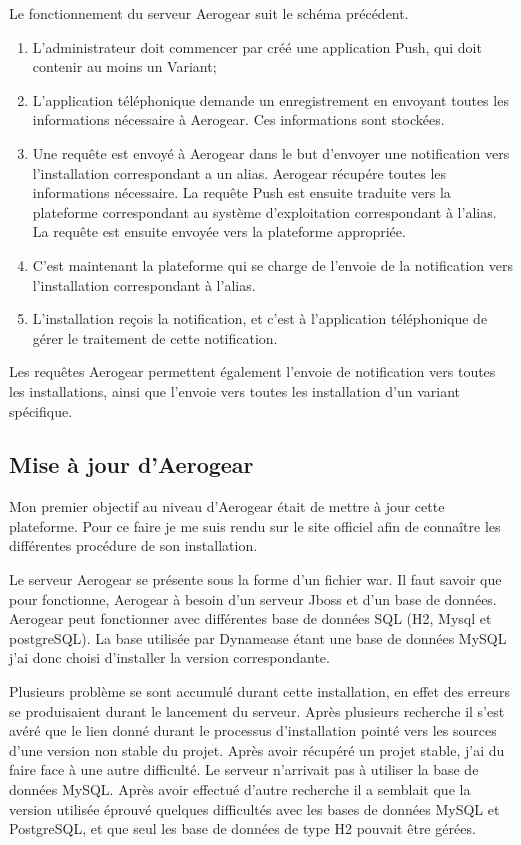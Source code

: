 Le fonctionnement du serveur Aerogear suit le schéma précédent.

\begin{enumerate}
 \item L'administrateur doit commencer par créé une application Push, qui doit contenir au moins un Variant;
 \item L'application téléphonique demande un enregistrement en envoyant toutes les informations nécessaire à Aerogear. Ces informations sont stockées.
 \item Une requête est envoyé à  Aerogear dans le but d'envoyer une notification vers l'installation correspondant a un alias. Aerogear récupére toutes les informations nécessaire. La requête Push est ensuite traduite vers la plateforme correspondant au système d'exploitation correspondant à l'alias. La requête est ensuite envoyée vers la plateforme appropriée.
 \item C'est maintenant la plateforme qui se charge de l'envoie de la notification vers l'installation correspondant à l'alias.
 \item L'installation reçois la notification, et c'est à l'application téléphonique de gérer le traitement de cette notification.
\end{enumerate}

Les requêtes Aerogear permettent également l'envoie de notification vers toutes les installations, ainsi que l'envoie vers toutes les installation d'un variant spécifique.

\subsection{Mise à jour d'Aerogear}

Mon premier objectif au niveau d'Aerogear était de mettre à jour cette plateforme. Pour ce faire je me suis rendu sur le site officiel afin de connaître les différentes procédure de son installation.

Le serveur Aerogear se présente sous la forme d'un fichier war. Il faut savoir que pour fonctionne, Aerogear à besoin d'un serveur Jboss et d'un base de données. Aerogear peut fonctionner avec différentes base de données SQL (H2, Mysql et postgreSQL). La base utilisée par Dynamease étant une base de données MySQL j'ai donc choisi d'installer la version correspondante.

Plusieurs problème se sont accumulé durant cette installation, en effet des erreurs se produisaient durant le lancement du serveur. Après plusieurs recherche il s'est avéré que le lien donné durant le processus d'installation pointé vers les sources d'une version non stable du projet. Après avoir récupéré un projet stable, j'ai du faire face à une autre difficulté. Le serveur n'arrivait pas à utiliser la base de données MySQL. Après avoir effectué d'autre recherche il a semblait que la version utilisée éprouvé quelques difficultés avec les bases de données MySQL et PostgreSQL, et que seul les base de données de type H2 pouvait être gérées.

